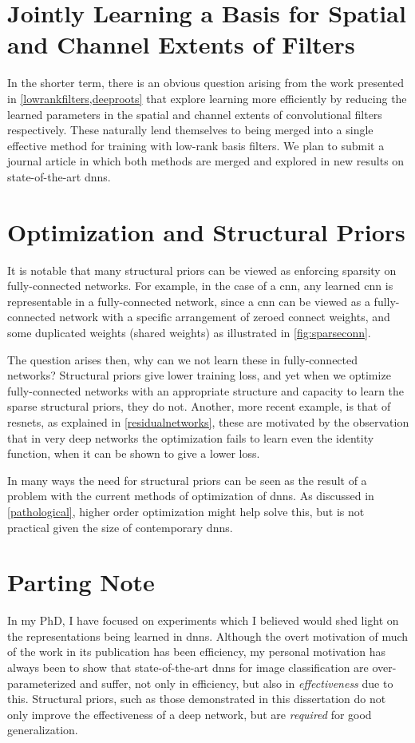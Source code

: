\documentclass[thesis]{subfiles}
\begin{document}
\section{Jointly Learning a Basis for Spatial and Channel Extents of Filters}
\label{journalplan}
In the shorter term, there is an obvious question arising from the work presented in \cref{lowrankfilters,deeproots} that explore learning more efficiently by reducing the learned parameters in the spatial and channel extents of convolutional filters respectively. These naturally lend themselves to being merged into a single effective method for training with low-rank basis filters. We plan to submit a journal article in which both methods are merged and explored in new results on state-of-the-art \glspl{dnn}.

\section{Optimization and Structural Priors}
It is notable that many structural priors can be viewed as enforcing sparsity on fully-connected networks. For example, in the case of a \gls{cnn}, any learned \gls{cnn} is representable in a fully-connected network, since a \gls{cnn} can be viewed as a fully-connected network with a specific arrangement of zeroed connect weights, and some duplicated weights (shared weights) as illustrated in \cref{fig:sparseconn}. 

The question arises then, why can we not learn these in fully-connected networks? Structural priors give lower training loss, and yet when we optimize fully-connected networks with an appropriate structure and capacity to learn the sparse structural priors, they do not. Another, more recent example, is that of \glspl{resnet}, as explained in \cref{residualnetworks}, these are motivated by the observation that in very deep networks the optimization fails to learn even the identity function, when it can be shown to give a lower loss.

In many ways the need for structural priors can be seen as the result of a problem with the current methods of optimization of \glspl{dnn}. As discussed in \cref{pathological}, higher order optimization might help solve this, but is not practical given the size of contemporary \glspl{dnn}. 

\section{Parting Note}
In my PhD, I have focused on experiments which I believed would shed light on the representations being learned in \glspl{dnn}. Although the overt motivation of much of the work in its publication has been efficiency, my personal motivation has always been to show that state-of-the-art \glspl{dnn} for image classification are over-parameterized and suffer, not only in efficiency, but also in \emph{effectiveness} due to this. Structural priors, such as those demonstrated in this dissertation do not only improve the effectiveness of a deep network, but are \emph{required} for good generalization.
\end{document}

